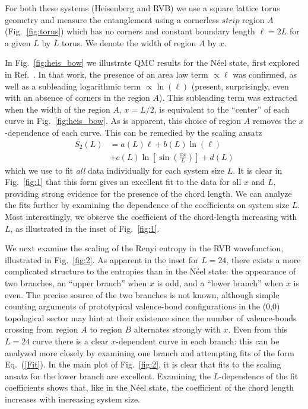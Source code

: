 \documentclass[prl,aps,twocolumn,floatfix,amsmath,amssymb,superscriptaddress,tightenlines]{revtex4}
\begin{document}
For both these systems (Heisenberg and RVB) we use a square lattice torus geometry and measure the entanglement %
using a cornerless $strip$ region $A$ (Fig.~\ref{fig:torus}) which has no corners and constant boundary length $\ell = 2L$ for a given $L$ by $L$ torus.
We denote the width of region $A$ by $x$.

In Fig.~{\ref{fig:heis_bow}} we illustrate QMC results for the N\'eel state, first explored in Ref.~\cite{HeisLog}.  In that work, the presence of an area law term $\propto \ell$ was confirmed, as well as a subleading logarithmic term $\propto \ln(\ell)$ (present, surprisingly, even with an absence of corners in the region $A$).  This subleading term was extracted when the width of the region $A$, $x = L/2$, is equivalent to the ``center'' of each curve in Fig.~{\ref{fig:heis_bow}}.  As is apparent, this choice of region $A$ removes the $x$-dependence of each curve.  This can be remedied
by the scaling ansatz
\begin{align}
S_2(L) &= a(L) \ell + b(L) \ln(\ell) \nonumber \\
&+ c(L) \ln \left[{ \sin\left({ \frac{\pi x}{L} }\right) }\right] + d(L) \label{Fit}
\end{align}
{\color{red} which we use to fit {\it all} data individually for each system size $L$. }
It is clear in Fig.~{\ref{fig:1}} that this form gives an excellent fit to the data for all $x$ and $L$, providing strong evidence for the presence of the chord length.  We can analyze the fits further by examining the dependence of the coefficients on system size $L$.  Most interestingly, we observe the coefficient of the chord-length increasing with $L$, as illustrated in the inset of Fig.~{\ref{fig:1}}.

We next examine the scaling of the Renyi entropy in the RVB wavefunction, illustrated in Fig.~{\ref{fig:2}}.  As apparent in the inset for $L=24$, there exists a more complicated structure to the entropies than in the N\'eel state: the appearance of two branches, an ``upper branch'' when $x$ is odd, and a ``lower branch'' when $x$ is even.  The precise source of the two branches is not known, although simple counting arguments of prototypical valence-bond configurations in the (0,0) topological sector may hint at their existence since the number of valence-bonds crossing from region $A$ to region $B$ alternates strongly with $x$.  Even from this $L=24$ curve there is a clear $x$-dependent curve in each branch: this can be analyzed more closely by examining one branch and attempting fits of the form Eq.~(\ref{Fit}).  In the main plot of Fig.~{\ref{fig:2}}, it is clear that fits to the scaling ansatz for the lower branch are excellent.  Examining the $L$-dependence of the fit coefficients shows that, like in the N\'eel state, the coefficient of the chord length increases with increasing system size.
\end{document}
